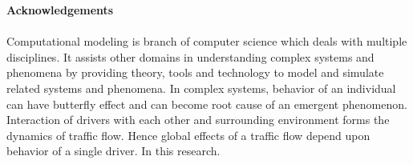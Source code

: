 {\Large{\textbf {Acknowledgements}}} \\ \\%
Computational modeling is branch of computer science which deals with multiple disciplines. It assists other domains in understanding complex systems and phenomena by providing theory, tools and technology to model and simulate related systems and phenomena. In complex systems, behavior of an individual can have butterfly effect and can become root cause of an emergent phenomenon. Interaction of drivers with each other and surrounding environment forms the dynamics of traffic flow. Hence global effects of a traffic flow depend upon behavior of a single driver. In this research.

